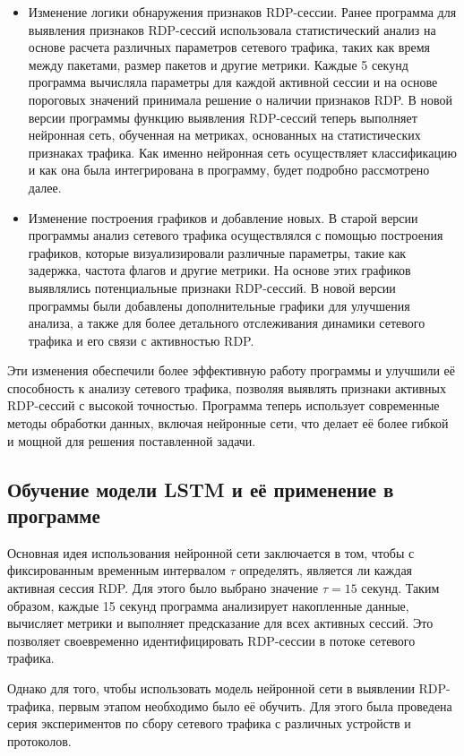 \documentclass[spec, och, diploma]{SCWorks}
\begin{document}
\begin{itemize}
  \item Изменение логики обнаружения признаков RDP-сессии. Ранее программа для выявления признаков RDP-сессий использовала статистический анализ 
  на основе расчета различных параметров сетевого трафика, таких как время между пакетами, размер пакетов и другие метрики. Каждые 5 секунд программа 
  вычисляла параметры для каждой активной сессии и на основе пороговых значений принимала решение о наличии признаков RDP. В новой версии программы 
  функцию выявления RDP-сессий теперь выполняет нейронная сеть, обученная на метриках, основанных на статистических признаках трафика. Как именно 
  нейронная сеть осуществляет классификацию и как она была интегрирована в программу, будет подробно рассмотрено далее.

  \item Изменение построения графиков и добавление новых. В старой версии программы анализ сетевого трафика осуществлялся с помощью построения 
  графиков, которые визуализировали различные параметры, такие как задержка, частота флагов и другие метрики. На основе этих графиков выявлялись потенциальные 
  признаки RDP-сессий. В новой версии программы были добавлены дополнительные графики для улучшения анализа, а также для более детального отслеживания динамики 
  сетевого трафика и его связи с активностью RDP.
\end{itemize}

Эти изменения обеспечили более эффективную работу программы и улучшили её способность к анализу сетевого трафика, позволяя выявлять признаки 
активных RDP-сессий с высокой точностью. Программа теперь использует современные методы обработки данных, включая нейронные сети, что делает 
её более гибкой и мощной для решения поставленной задачи.

\subsection{Обучение модели LSTM и её применение в программе}

Основная идея использования нейронной сети заключается в том, чтобы с фиксированным временным интервалом $\tau$ определять, 
является ли каждая активная сессия RDP. Для этого было выбрано значение $\tau = 15$ секунд. Таким образом, каждые 15 секунд 
программа анализирует накопленные данные, вычисляет метрики и выполняет предсказание для всех активных сессий. Это позволяет 
своевременно идентифицировать RDP-сессии в потоке сетевого трафика.  

Однако для того, чтобы использовать модель нейронной сети в выявлении RDP-трафика, первым этапом необходимо было её обучить. Для этого была проведена 
серия экспериментов по сбору сетевого трафика с различных устройств и протоколов.  
\end{document}
